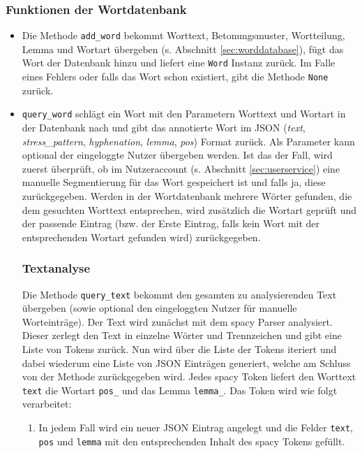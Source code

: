 \subsubsection{Funktionen der Wortdatenbank}
\begin{itemize}
	\item Die Methode \texttt{add\_word} bekommt Worttext, Betonungsmuster, Wortteilung, Lemma und Wortart übergeben (s. Abschnitt \ref{sec:worddatabase}), fügt das Wort der Datenbank hinzu und liefert eine \texttt{Word} Instanz zurück. Im Falle eines Fehlers oder falls das Wort schon existiert, gibt die Methode \texttt{None} zurück.
	
	\item \texttt{query\_word} schlägt ein Wort mit den Parametern Worttext und Wortart in der Datenbank nach und gibt das annotierte Wort im JSON (\textit{text}, \textit{stress\_pattern}, \textit{hyphenation}, \textit{lemma}, \textit{pos}) Format zurück. Als Parameter kann optional der eingeloggte Nutzer übergeben werden. Ist das der Fall, wird zuerst überprüft, ob im Nutzeraccount (s. Abschnitt \ref{sec:userservice}) eine manuelle Segmentierung für das Wort gespeichert ist und falls ja, diese zurückgegeben. Werden in der Wortdatenbank mehrere Wörter gefunden, die dem gesuchten Worttext entsprechen, wird zusätzlich die Wortart geprüft und der passende Eintrag (bzw. der Erste Eintrag, falls kein Wort mit der entsprechenden Wortart gefunden wird) zurückgegeben.
	
\subsubsection{Textanalyse}
Die Methode \texttt{query\_text} bekommt den gesamten zu analysierenden Text übergeben (sowie optional den eingeloggten Nutzer für manuelle Worteinträge). Der Text wird zunächst mit dem spacy Parser analysiert. Dieser zerlegt den Text in einzelne Wörter und Trennzeichen und gibt eine Liste von Tokens zurück. Nun wird über die Liste der Tokens iteriert und dabei wiederum eine Liste von JSON Einträgen generiert, welche am Schluss von der Methode zurückgegeben wird. Jedes spacy Token liefert den Worttext \texttt{text} die Wortart \texttt{pos\_} und das Lemma \texttt{lemma\_}. Das Token wird wie folgt verarbeitet:

\begin{enumerate}
	\item In jedem Fall wird ein neuer JSON Eintrag angelegt und die Felder \texttt{text}, \texttt{pos} und \texttt{lemma} mit den entsprechenden Inhalt des spacy Tokens gefüllt.
	

\end{enumerate}
\end{itemize}
